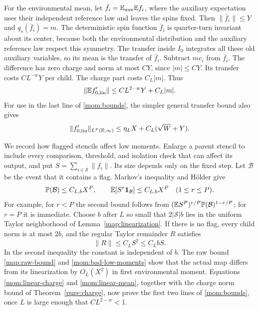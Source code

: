 For the environmental mean, let
$\bar f_i=\mathbb E_{\mathrm{aux}}\mathbb E f_i$, where the auxiliary expectation
uses their independent reference law and leaves the spins fixed.
Then $\|\bar f_i\|\le Y$ and $q_s(\bar f_i)=m$.
The deterministic spin function $\bar f_i$ is quarter-turn invariant
about its center, because both the environmental distribution and the
auxiliary reference law respect this symmetry.  The transfer inside
$I_0$ integrates all these old auxiliary variables, so its mean is
the transfer of $\bar f_i$.  Subtract $m e_i$ from $\bar f_i$.
The difference has zero charge and norm at most $CY$,
since $|m|\le CY$.  Its transfer costs $CL^{-w}Y$ per child.  The charge
part costs $C_L|m|$.  Thus
\begin{equation}\label{mom:linear-mean}
 \|\mathbb E f'_{0,\mathrm{lin}}\|
 \le CL^{2-w}Y+C_L|m|.
\end{equation}
For use in the last line of \eqref{mom:bounds}, the simpler general
transfer bound also gives
\begin{equation}\label{mom:linear-total}
 \|f'_{0,\mathrm{lin}}\|_{L^P(\mathbb E;\infty)}
 \le\eta_LX+C_L(\sqrt W+Y).
\end{equation}

We record how flagged stencils affect low moments.  Enlarge a parent
stencil to include every comparison, threshold, and isolation check
that can affect its output, and put $S=\sum_{i\in\mathcal S}\|f_i\|$.
Its size depends only on the fixed step.  Let $\mathcal B$ be the event
that it contains a flag.  Markov's inequality and H\"older give
\begin{equation}\label{mom:bad-low-moments}
 \mathbb P(\mathcal B)\le C_{L,b}X^P,
 \qquad \mathbb E[S^r\mathbf 1_{\mathcal B}]\le C_{L,b}X^P
 \quad(1\le r\le P).
\end{equation}
For example, for $r<P$ the second bound follows from
$(\mathbb E S^P)^{r/P}\mathbb P(\mathcal B)^{1-r/P}$; for $r=P$ it is immediate.
Choose $b$ after $L$ so small that $2|\mathcal S|b$ lies in the uniform
Taylor neighborhood of Lemma~\ref{map:linearization}.  If there is no
flag, every child norm is at most $2b$, and the regular Taylor remainder
$R$ satisfies
\begin{equation}\label{mom:regular-remainder}
 \|R\|\le C_LS^2\le C_LbS.
\end{equation}
In the second inequality the constant is independent of $b$.
The raw bound \eqref{map:raw-bound} and
\eqref{mom:bad-low-moments} show that the actual map differs from its
linearization by $O_L(X^2)$ in first environmental moment.  Equations
\eqref{mom:linear-charge} and \eqref{mom:linear-mean}, together with the
charge norm bound of Theorem~\ref{pure:charge}, now prove the first
two lines of \eqref{mom:bounds}, once $L$ is large enough that
$CL^{2-w}<1$.

